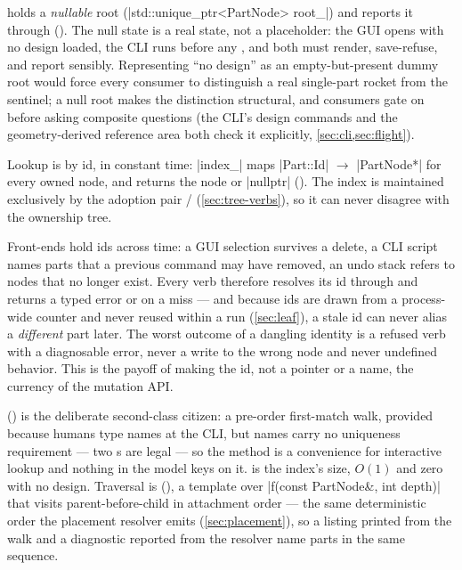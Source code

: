  holds a \emph{nullable} root (\cppinline|std::unique_ptr<PartNode> root_|) and
reports it through  (). The null state is a
real state, not a placeholder: the GUI opens with no design loaded, the CLI runs before any
, and both must render, save-refuse, and report sensibly. Representing ``no
design'' as an empty-but-present dummy root would force every consumer to distinguish a real
single-part rocket from the sentinel; a null root makes the distinction structural, and consumers
gate on  before asking composite questions (the CLI's design commands and the
geometry-derived reference area both check it explicitly, \cref{sec:cli,sec:flight}).

Lookup is by id, in constant time: \cppinline|index_| maps
\cppinline|Part::Id| $\to$ \cppinline|PartNode*| for every owned node, and  returns
the node or \cppinline|nullptr| (). The index is maintained
exclusively by the adoption pair /
(\cref{sec:tree-verbs}), so it can never disagree with the ownership tree.

\begin{keyinsight}
Front-ends hold ids across time: a GUI selection survives a delete, a CLI script names parts that
a previous command may have removed, an undo stack refers to nodes that no longer exist. Every
verb therefore resolves its id through  and returns a typed error or  on a
miss --- and because ids are drawn from a process-wide counter and never reused within a run
(\cref{sec:leaf}), a stale id can never alias a \emph{different} part later. The worst outcome of
a dangling identity is a refused verb with a diagnosable error, never a write to the wrong node
and never undefined behavior. This is the payoff of making the id, not a pointer or a name, the
currency of the mutation API.
\end{keyinsight}

 () is the deliberate second-class citizen:
a pre-order first-match walk, provided because humans type names at the CLI, but names carry no
uniqueness requirement --- two s are legal --- so the method is a convenience
for interactive lookup and nothing in the model keys on it.  is the index's size,
$O(1)$ and zero with no design. Traversal is 
(), a template over \cppinline|f(const PartNode&, int depth)|
that visits parent-before-child in attachment order --- the same deterministic order the placement
resolver emits (\cref{sec:placement}), so a listing printed from the walk and a diagnostic
reported from the resolver name parts in the same sequence.

